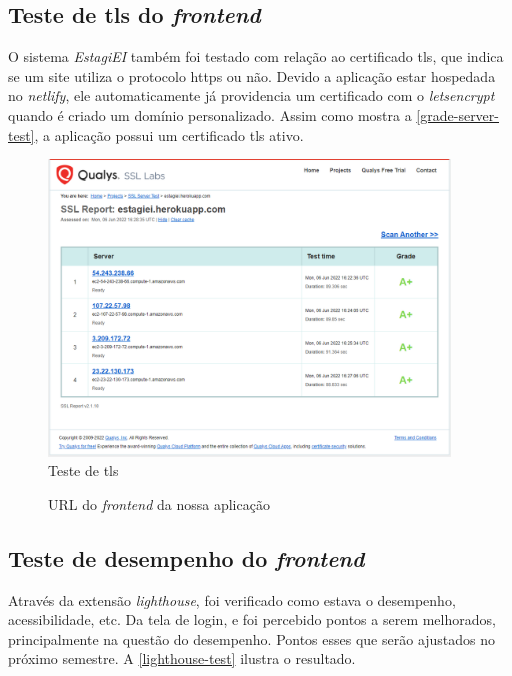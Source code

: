 \subsection{Teste de \ac{tls} do \textit{\gls{frontend}}}
O sistema \emph{EstagiEI} também foi testado com relação ao certificado \ac{tls}, que indica se um site utiliza o protocolo \ac{https} ou não. Devido a aplicação estar hospedada no \textit{\gls{netlify}}, ele automaticamente já providencia um certificado com o \textit{\gls{letsencrypt}} quando é criado um domínio personalizado. Assim como mostra a \autoref{grade-server-test}, a aplicação possui um certificado \ac{tls} ativo.

\begin{figure}[H]
	\centering
	\caption{\label{grade-server-test}Teste de \ac{tls}}
	\includegraphics[width=0.95\textwidth]{../imagens/web-tests/grade-server-test.png}
\end{figure}

\begin{figure}[htb]
	\caption{\label{qr-url-frontend}URL do \textit{\gls{frontend}} da nossa aplicação}
	\begin{center}
	\end{center}
\end{figure}

\subsection{Teste de desempenho do \textit{\gls{frontend}}}
Através da extensão \textit{\gls{lighthouse}}, foi verificado como estava o desempenho, acessibilidade, etc. Da tela de login, e foi percebido pontos a serem melhorados, principalmente na questão do desempenho. Pontos esses que serão ajustados no próximo semestre. A \autoref{lighthouse-test} ilustra o resultado.

